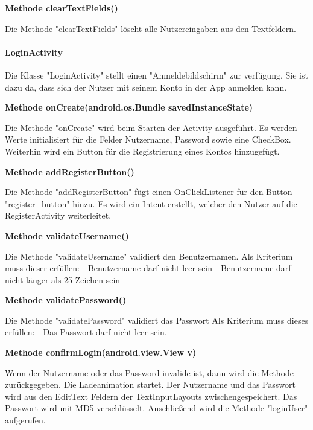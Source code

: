 \documentclass{scrartcl}
\begin{document}
\noindent\textbf{Methode clearTextFields()}
 
\noindent Die Methode "clearTextFields" löscht alle Nutzereingaben aus den Textfeldern. \newline



\paragraph{LoginActivity}
Die Klasse "LoginActivity" stellt einen "Anmeldebildschirm" zur verfügung. Sie ist dazu da, dass sich der Nutzer mit seinem Konto in der App anmelden kann. \newline 

\noindent\textbf{Methode onCreate(android.os.Bundle savedInstanceState)}

\noindent Die Methode "onCreate" wird beim Starten der Activity ausgeführt. Es werden Werte initialisiert für die Felder Nutzername, Password sowie eine CheckBox. Weiterhin wird ein Button für die Registrierung eines Kontos hinzugefügt. \newline 

\noindent\textbf{Methode addRegisterButton()}

\noindent Die Methode "addRegisterButton" fügt einen OnClickListener für den Button "register\_button" hinzu. Es wird ein Intent erstellt, welcher den Nutzer auf die RegisterActivity weiterleitet. \newline

\noindent\textbf{Methode validateUsername()}

\noindent Die Methode "validateUsername" validiert den Benutzernamen. Als Kriterium muss dieser erfüllen: - Benutzername darf nicht leer sein - Benutzername darf nicht länger als 25 Zeichen sein \newline 

\noindent\textbf{Methode validatePassword()}

\noindent Die Methode "validatePassword" validiert das Passwort Als Kriterium muss dieses erfüllen: - Das Passwort darf nicht leer sein. \newline 

\noindent\textbf{Methode confirmLogin(android.view.View v)}

\noindent Wenn der Nutzername oder das Password invalide ist, dann wird die Methode zurückgegeben. Die Ladeanimation startet. Der Nutzername und das Passwort wird aus den EditText Feldern der TextInputLayouts zwischengespeichert. Das Passwort wird mit MD5 verschlüsselt. Anschließend wird die Methode "loginUser" aufgerufen. \newline 
\end{document}
